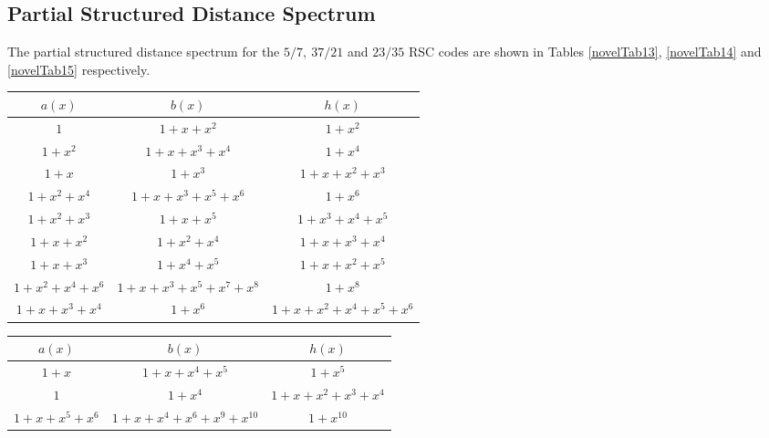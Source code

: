 \subsection{Partial Structured Distance Spectrum}
The partial structured distance spectrum for the $5/7,~37/21$ and $23/35$ RSC codes are shown in Tables \ref{novelTab13},  \ref{novelTab14} and \ref{novelTab15} respectively. 

\begin{table*}[h!]
 \caption{Partial Structured Distance Spectrum for the $5/7$ RSC code,$d_{\text{max}}=8$}
\centering
 \begin{tabular}{c c c} 
 \hline
 $a(x)$ & $b(x)$ & $h(x)$ \\ [0.5ex] 
 \hline\hline
$1$ & $1+x+x^{2}$ & $1+x^2$\\
\hline
$1+x^2$ & $1+x+x^3+x^4$ & $1+x^{4}$\\
\hline
$1+x$ & $1+x^3$ & $1+x+x^2+x^3$\\
\hline
$1+x^2+x^4$ & $1+x+x^3+x^5+x^6$ & $1+x^{6}$\\
\hline
$1+x^2+x^3$ & $1+x+x^5$ & $1+x^3+x^4+x^5$\\
\hline
$1+x+x^2$ & $1+x^2+x^4$ & $1+x+x^3+x^4$\\
\hline
$1+x+x^3$ & $1+x^4+x^5$ & $1+x+x^2+x^5$\\
\hline
$1+x^2+x^4+x^6$ & $1+x+x^3+x^5+x^7+x^8$ & $1+x^8$\\
\hline
$1+x+x^3+x^4$ & $1+x^6$ & $1+x+x^2+x^4+x^5+x^6$\\
 \end{tabular}
 
 \label{novelTab13}
\end{table*}

\begin{table*}[h!]
 \caption{Partial Structured Distance Spectrum for the $37/21$ RSC code,$d_{\text{max}}=9$}
\centering
 \begin{tabular}{c c c} 
 \hline
 $a(x)$ & $b(x)$ & $h(x)$ \\ [0.5ex] 
 \hline\hline
$1+x$ & $1+x+x^{4}+x^5$ & $1+x^5$\\
\hline
$1$ & $1+x^4$ & $1+x+x^2+x^3+x^4$\\
\hline
$1+x+x^5+x^6$ & $1+x+x^4+x^6+x^9+x^{10}$ & $1+x^{10}$\\
 \end{tabular}
 
 \label{novelTab14}
\end{table*}

